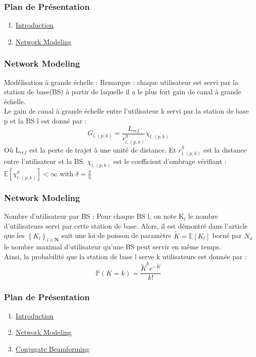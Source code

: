 \documentclass[pdf]{beamer}
\begin{document}
\begin{frame}
\frametitle{Plan de Présentation }
\begin{enumerate}
	\item \hyperlink{Introduction}{Introduction}
	\item \hyperlink{networkModeling}{Network Modeling}
\end{enumerate}
\end{frame}

\begin{frame}[label=networkModeling]
\frametitle{Network Modeling}
\transblindshorizontal
\begin{exampleblock}{Modélisation à grande échelle :}
\justify
Remarque : chaque utilisateur est servi par la station de base(BS) à partir de laquelle il a le plus fort gain de canal à grande échelle.\\
Le gain de canal à grande échelle entre l'utilisateur k servi par la station de base p et la BS l est donné par :  
$$G_{l,(p,k)}=\frac{L_{ref}}{r_{l,( p,k)}^{\eta}}\chi_{l, (p,k)}$$
Où L$_{ref}$ est la perte de trajet à une unité de distance. Et ${r_{l,( p,k)}^{\eta}}$ est la distance entre l'utilisateur et la BS. $\chi_{l, (p,k)}$ est le coefficient d'ombrage vérifiant : $\mathbb{E}\left[\chi_{l, (p,k)}^{\delta}\right] < \infty$ with $\delta = \frac{2}{\eta}$
\end{exampleblock}
\end{frame}

\begin{frame}
\frametitle{Network Modeling}
\transblindshorizontal
\begin{exampleblock}{Nombre d'utilisateur par BS :}
\justify
Pour chaque BS l, on note K$_l$ le nombre d'utilisateurs servi par cette station de base. Alors, il est démontré dans l'article que les $\left\lbrace K_l \right \rbrace_{l \in \mathbf{N}}$ suit une loi de poisson de paramètre $\tilde{K}=\mathbb{E}\left[K_l\right]$ borné par $N_a$ le nombre maximal d'utilisateur qu'une BS peut servir en même temps.\\
Ainsi, la probabilité que la station de base l serve k utilisateurs est donnée par : $$\mathbb{P}\left(K=k\right) = \frac{\tilde{K}^ke^{-\tilde{K}}}{k!}$$
\end{exampleblock}
\end{frame}

\begin{frame}
\frametitle{Plan de Présentation }
\begin{enumerate}
	\item \hyperlink{Introduction}{Introduction}
	\item \hyperlink{networkModeling}{Network Modeling}
	\item \hyperlink{conjugateBeamforming}{Conjugate Beamforming}
\end{enumerate}
\end{frame}
\end{document}
